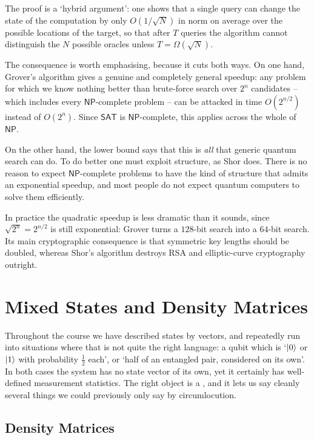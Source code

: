 \documentclass[a4paper]{scrartcl}
\newcommand{\class}[1]{\mathsf{#1}}
\begin{document}
The proof is a `hybrid argument': one shows that a single query can change the state of the computation by only $O(1/\sqrt N)$ in norm on average over the possible locations of the target, so that after $T$ queries the algorithm cannot distinguish the $N$ possible oracles unless $T = \Omega(\sqrt N)$.

The consequence is worth emphasising, because it cuts both ways. On one hand, Grover's algorithm gives a genuine and completely general speedup: any problem for which we know nothing better than brute-force search over $2^n$ candidates -- which includes every $\class{NP}$-complete problem -- can be attacked in time $O(2^{n/2})$ instead of $O(2^n)$. Since $\mathsf{SAT}$ is $\class{NP}$-complete, this applies across the whole of $\class{NP}$.

On the other hand, the lower bound says that this is \emph{all} that generic quantum search can do. To do better one must exploit structure, as Shor does. There is no reason to expect $\class{NP}$-complete problems to have the kind of structure that admits an exponential speedup, and most people do not expect quantum computers to solve them efficiently.

\begin{remark}
	In practice the quadratic speedup is less dramatic than it sounds, since $\sqrt{2^n} = 2^{n/2}$ is still exponential: Grover turns a $128$-bit search into a $64$-bit search. Its main cryptographic consequence is that symmetric key lengths should be doubled, whereas Shor's algorithm destroys RSA and elliptic-curve cryptography outright.
\end{remark}

\section{Mixed States and Density Matrices}

Throughout the course we have described states by vectors, and repeatedly run into situations where that is not quite the right language: a qubit which is `$\ket0$ or $\ket1$ with probability $\tfrac12$ each', or `half of an entangled pair, considered on its own'. In both cases the system has no state vector of its own, yet it certainly has well-defined measurement statistics. The right object is a , and it lets us say cleanly several things we could previously only say by circumlocution.

\subsection{Density Matrices}
\end{document}
